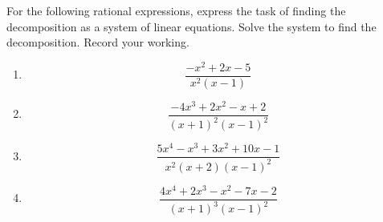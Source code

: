 \begin{reduce}
\begin{exercise}  
For the following rational expressions, express the task of finding the  decomposition as a system of linear equations.
Solve the system to find the decomposition.  
Record your working.
\begin{enumerate}
\item 
\begin{equation*}
\frac{-x^2+2x-5}{x^2(x-1)}
\end{equation*}

\item 
\begin{equation*}
\frac{-4x^3+2x^2-x+2}{(x+1)^2(x-1)^2}
\end{equation*}

\item 
\begin{equation*}
\frac{5x^4-x^3+3x^2+10x-1}{x^2(x+2)(x-1)^2}
\end{equation*}


\item 
\begin{equation*}
\frac{4x^4+2x^3-x^2-7x-2}{(x+1)^3(x-1)^2}
\end{equation*}

\end{enumerate}
\end{exercise}
\end{reduce}





